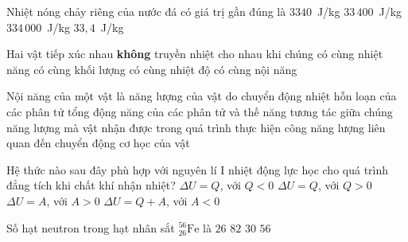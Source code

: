 	\begin{ex}%
		Nhiệt nóng chảy riêng của nước đá có giá trị gần đúng là
		\choice
		{$3340$~J/kg}
		{$33\,400$~J/kg}
		{\True $334\,000$~J/kg}
		{$33{,}4$~J/kg}
	\end{ex}

	\begin{ex}%
		Hai vật tiếp xúc nhau \textbf{không} truyền nhiệt cho nhau khi chúng
		\choice
		{có cùng nhiệt năng}
		{có cùng khối lượng}
		{\True có cùng nhiệt độ}
		{có cùng nội năng}
	\end{ex}

	\begin{ex}%
		Nội năng của một vật là
		\choice
		{năng lượng của vật do chuyển động nhiệt hỗn loạn của các phân tử}
		{\True tổng động năng của các phân tử và thế năng tương tác giữa chúng}
		{năng lượng mà vật nhận được trong quá trình thực hiện công}
		{năng lượng liên quan đến chuyển động cơ học của vật}
	\end{ex}

	\begin{ex}%
		Hệ thức nào sau đây phù hợp với nguyên lí I nhiệt động lực học cho quá trình đẳng tích khi chất khí nhận nhiệt?
		\choice
		{$\Delta U=Q$, với $Q<0$}
		{\True $\Delta U=Q$, với $Q>0$}
		{$\Delta U=A$, với $A>0$}
		{$\Delta U=Q+A$, với $A<0$}
	\end{ex}

	\begin{ex}%
		Số hạt neutron trong hạt nhân sắt ${}^{56}_{26}\text{Fe}$ là
		\choice
		{$26$}
		{$82$}
		{\True $30$}
		{$56$}
	\end{ex}

